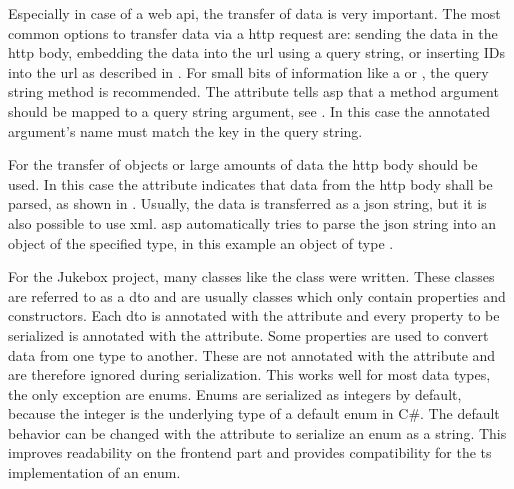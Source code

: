 
Especially in case of a web \gls{api}, the transfer of data is very important. The most common options to transfer data via a \gls{http} request are: sending the data in the \gls{http} body, embedding the data into the \gls{url} using a query string, or inserting IDs into the \gls{url} as described in . For small bits of information like a  or , the query string method is recommended. The \lstcode{[FromQuery]} attribute tells \gls{asp} that a method argument should be mapped to a query string argument, see . In this case the annotated argument's name must match the key in the query string.

For the transfer of objects or large amounts of data the \gls{http} body should be used. In this case the \lstcode{[FromBody]} attribute indicates that data from the \gls{http} body shall be parsed, as shown in . Usually, the data is transferred as a \gls{json} string, but it is also possible to use \gls{xml}. \gls{asp} automatically tries to parse the \gls{json} string into an object of the specified type, in this example an object of type .


For the Jukebox project, many classes like the  class were written. These classes are referred to as a \gls{dto} and are usually  classes which only contain properties and constructors. Each \gls{dto} is annotated with the \lstcode{[DataContract]} attribute and every property to be serialized is annotated with the \lstcode{[DataMember]} attribute. Some properties are used to convert data from one type to another. These are not annotated with the \lstcode{[DataMember]} attribute and are therefore ignored during serialization. This works well for most data types, the only exception are enums. Enums are serialized as integers by default, because the integer is the underlying type of a default enum in C\#. The default behavior can be changed with the  attribute to serialize an enum as a string. This improves readability on the frontend part and provides compatibility for the \gls{ts} implementation of an enum. \cite{mvcModelBinding}


